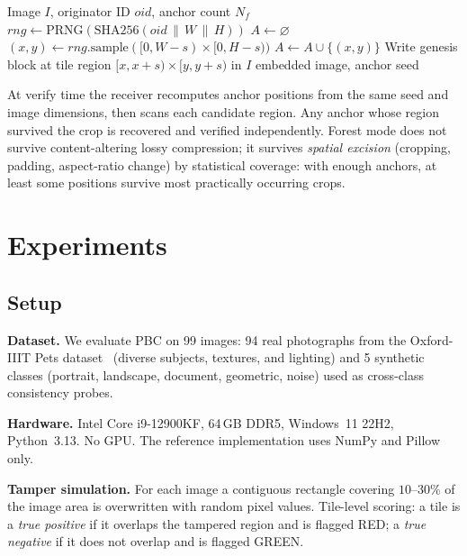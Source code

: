 \documentclass[conference]{IEEEtran}
\begin{document}
\begin{algorithm}[t]
  \caption{PBC-Forest Encode}
  \label{alg:forest}
  \begin{algorithmic}[1]
    \REQUIRE Image $I$, originator ID $\mathit{oid}$, anchor count $N_f$
    \STATE $\mathit{rng} \leftarrow \mathrm{PRNG}(\mathrm{SHA256}(\mathit{oid} \,\|\, W \,\|\, H))$
    \STATE $A \leftarrow \varnothing$ 
      \STATE $(x, y) \leftarrow \mathit{rng}.\mathrm{sample}([0,W{-}s) \times [0,H{-}s))$
      \IF{$[x, x{+}s) \times [y, y{+}s)$ does not overlap any $a \in A$}
        \STATE $A \leftarrow A \cup \{(x,y)\}$
      \ENDIF
    \ENDWHILE
      \STATE Write genesis block at tile region $[x,x{+}s)\times[y,y{+}s)$ in $I$
    \ENDFOR
    \RETURN embedded image, anchor seed
  \end{algorithmic}
\end{algorithm}

At verify time the receiver recomputes anchor positions from the same
seed and image dimensions, then scans each candidate region. Any anchor
whose region survived the crop is recovered and verified independently.
Forest mode does not survive content-altering lossy compression; it
survives \emph{spatial excision} (cropping, padding, aspect-ratio
change) by statistical coverage: with enough anchors, at least some
positions survive most practically occurring crops.

\section{Experiments}
\label{sec:experiments}

\subsection{Setup}

\textbf{Dataset.} We evaluate PBC on 99 images: 94 real photographs
from the Oxford-IIIT Pets dataset~\cite{pets_dataset} (diverse
subjects, textures, and lighting) and 5 synthetic classes (portrait,
landscape, document, geometric, noise) used as cross-class consistency
probes.

\textbf{Hardware.} Intel Core i9-12900KF, 64\,GB DDR5, Windows~11
22H2, Python~3.13. No GPU. The reference implementation uses NumPy
and Pillow only.

\textbf{Tamper simulation.} For each image a contiguous rectangle
covering $10$--$30\%$ of the image area is overwritten with random
pixel values. Tile-level scoring: a tile is a \emph{true positive} if
it overlaps the tampered region and is flagged RED; a \emph{true
negative} if it does not overlap and is flagged GREEN.
\end{document}
